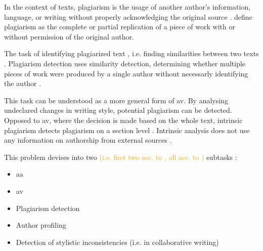\begin{definition}
    [Plagiarism]
    In the context of texts, plagiarism is the usage of another author's information, language, 
    or writing without properly acknowledging the original source \cite{stein_intrinsic_2011}.
    \citet{elmanarelbouanani_authorship_2014} define plagiarism as the complete or partial replication 
    of a piece of work with or without permission of the original author.
\end{definition}

\begin{definition}
    The task of identifying plagiarized text \cite{stein_intrinsic_2011}, i.e. finding similarities between two texts \cite{stamatatos_survey_2009}.
    Plagiarism detection uses similarity detection, determining whether multiple pieces of work were produced by a single author 
    without necessarly identifying the author \cite{elmanarelbouanani_authorship_2014}.
\end{definition}

\begin{definition}
    This task can be understood as a more general form of \ac{av}.
    By analysing undeclared changes in writing style, potential plagiarism can be detected.
    Opposed to \ac{av}, where the decision is made based on the whole text, 
    intrinsic plagiarism detects plagiarism on a section level \cite{stein_intrinsic_2011}.
    Intrinsic analysis does not use any information on authorship from external sources \cite{zangerle_overview_2024}.
\end{definition}

\begin{definition}
    This problem devises into two \textcolor{orange}{(i.e. first two acc. to \cite{stein_intrinsic_2011}, all acc. to \cite{stamatatos_survey_2009})} subtasks \cite{stein_intrinsic_2011}:
    \begin{itemize}
        \item \ac{aa} \cite{stein_intrinsic_2011}
        \item \ac{av} \cite{stein_intrinsic_2011,stamatatos_survey_2009}
        \item Plagiarism detection \cite{stamatatos_survey_2009}
        \item Author profiling \cite{stamatatos_survey_2009}
        \item Detection of stylistic inconsistencies (i.e. in collaborative writing) \cite{stamatatos_survey_2009}
    \end{itemize}
\end{definition}

